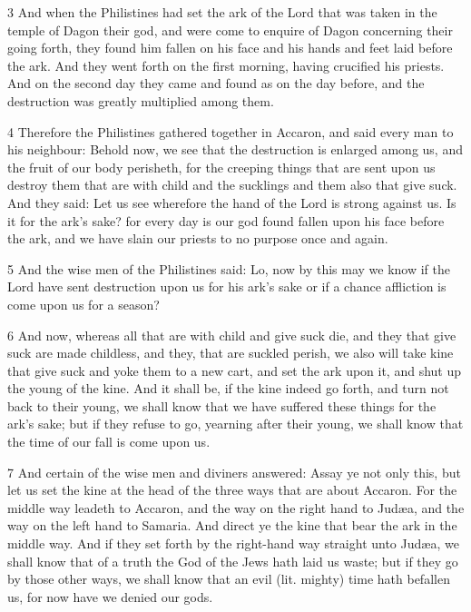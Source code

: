 \par 3 And when the Philistines had set the ark of the Lord that was taken in the temple of Dagon their god, and were come to enquire of Dagon concerning their going forth, they found him fallen on his face and his hands and feet laid before the ark. And they went forth on the first morning, having crucified his priests. And on the second day they came and found as on the day before, and the destruction was greatly multiplied among them. 

\par 4 Therefore the Philistines gathered together in Accaron, and said every man to his neighbour: Behold now, we see that the destruction is enlarged among us, and the fruit of our body perisheth, for the creeping things that are sent upon us destroy them that are with child and the sucklings and them also that give suck. And they said: Let us see wherefore the hand of the Lord is strong against us. Is it for the ark's sake? for every day is our god found fallen upon his face before the ark, and we have slain our priests to no purpose once and again. 

\par 5 And the wise men of the Philistines said: Lo, now by this may we know if the Lord have sent destruction upon us for his ark's sake or if a chance affliction is come upon us for a season? 

\par 6 And now, whereas all that are with child and give suck die, and they that give suck are made childless, and they, that are suckled perish, we also will take kine that give suck and yoke them to a new cart, and set the ark upon it, and shut up the young of the kine. And it shall be, if the kine indeed go forth, and turn not back to their young, we shall know that we have suffered these things for the ark's sake; but if they refuse to go, yearning after their young, we shall know that the time of our fall is come upon us. 

\par 7 And certain of the wise men and diviners answered: Assay ye not only this, but let us set the kine at the head of the three ways that are about Accaron. For the middle way leadeth to Accaron, and the way on the right hand to Judæa, and the way on the left hand to Samaria. And direct ye the kine that bear the ark in the middle way. And if they set forth by the right-hand way straight unto Judæa, we shall know that of a truth the God of the Jews hath laid us waste; but if they go by those other ways, we shall know that an evil (lit. mighty) time hath befallen us, for now have we denied our gods. 

